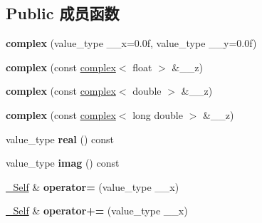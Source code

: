 \subsection*{Public 成员函数}
\begin{DoxyCompactItemize}
\item 
\mbox{\label{structcomplex_3_01float_01_4_ae28ed395ebb8fa5e315e921bdd548f45}} 
{\bfseries complex} (value\+\_\+type \+\_\+\+\_\+x=0.\+0f, value\+\_\+type \+\_\+\+\_\+y=0.\+0f)
\item 
\mbox{\label{structcomplex_3_01float_01_4_a433e2f5798d022c977d9d0b12b8df9ed}} 
{\bfseries complex} (const \hyperlink{structcomplex}{complex}$<$ float $>$ \&\+\_\+\+\_\+z)
\item 
\mbox{\label{structcomplex_3_01float_01_4_a5f01075ac17f39fed415e9aa47ecf4e7}} 
{\bfseries complex} (const \hyperlink{structcomplex}{complex}$<$ double $>$ \&\+\_\+\+\_\+z)
\item 
\mbox{\label{structcomplex_3_01float_01_4_a066442fe538068d0fd9dcae7d6abd365}} 
{\bfseries complex} (const \hyperlink{structcomplex}{complex}$<$ long double $>$ \&\+\_\+\+\_\+z)
\item 
\mbox{\label{structcomplex_3_01float_01_4_a3c5cdd6ad75dd081d2bc183d386677db}} 
value\+\_\+type {\bfseries real} () const
\item 
\mbox{\label{structcomplex_3_01float_01_4_ad974b6773015f20cc55c15136d585521}} 
value\+\_\+type {\bfseries imag} () const
\item 
\mbox{\label{structcomplex_3_01float_01_4_ad26507866a62e89f3cab5dff871a5390}} 
\hyperlink{structcomplex_3_01float_01_4}{\+\_\+\+Self} \& {\bfseries operator=} (value\+\_\+type \+\_\+\+\_\+x)
\item 
\mbox{\label{structcomplex_3_01float_01_4_a2eb570b0ce82602e0c8fe443cade5329}} 
\hyperlink{structcomplex_3_01float_01_4}{\+\_\+\+Self} \& {\bfseries operator+=} (value\+\_\+type \+\_\+\+\_\+x)
\item 

\end{DoxyCompactItemize}
